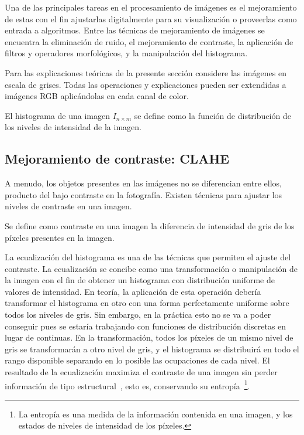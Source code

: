 Una de las principales tareas en el procesamiento de imágenes es el mejoramiento de estas con el fin ajustarlas digitalmente para su visualización o proveerlas como entrada a algoritmos. Entre las técnicas de mejoramiento de imágenes se encuentra la eliminación de ruido, el mejoramiento de contraste, la aplicación de filtros y operadores morfológicos, y la manipulación del histograma.

Para las explicaciones teóricas de la presente sección considere las imágenes en escala de grises. Todas las operaciones y explicaciones pueden ser extendidas a imágenes RGB aplicándolas en cada canal de color.

\begin{definition}
	El histograma de una imagen $I_{n \times m}$ se define como la función de distribución de los niveles de intensidad de la imagen.
\end{definition}

\subsection{Mejoramiento de contraste: CLAHE}

A menudo, los objetos presentes en las imágenes no se diferencian entre ellos, producto del bajo contraste en la fotografía. Existen técnicas para ajustar los niveles de contraste en una imagen.

\begin{definition}
	Se define como contraste en una imagen la diferencia de intensidad de gris de los píxeles presentes en la imagen.
\end{definition}

La ecualización del histograma es una de las técnicas que permiten el ajuste del contraste. La ecualización se concibe como una transformación o manipulación de la imagen con el fin de obtener un histograma con distribución uniforme de valores de intensidad. En teoría, la aplicación de esta operación debería transformar el histograma en otro con una forma perfectamente uniforme sobre todos los niveles de gris. Sin embargo, en la práctica esto no se va a poder conseguir pues se estaría trabajando con funciones de distribución discretas en lugar de continuas. En la transformación, todos los píxeles de un mismo nivel de gris se transformarán a otro nivel de gris, y el histograma se distribuirá en todo el rango disponible separando en lo posible las ocupaciones de cada nivel. El resultado de la ecualización maximiza el contraste de una imagen sin perder información de tipo estructural~\cite{solomon2011fundamentals}, esto es, conservando su entropía~\footnote{La entropía es una medida de la información contenida en una imagen, y los estados de niveles de intensidad de los píxeles.}.

